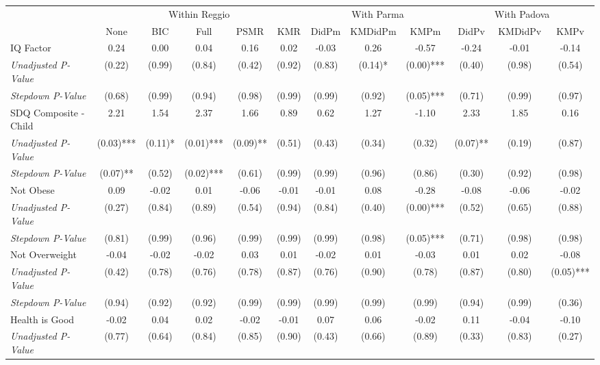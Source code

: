 \begin{tabular}{l c c c c c c c c c c c}
\toprule
& \multicolumn{5}{c}{Within Reggio} & \multicolumn{3}{c}{With Parma} & \multicolumn{3}{c}{With Padova} \\\cmidrule(lr){2-6} \cmidrule(lr){7-9} \cmidrule(lr){10-12}
 & None & BIC & Full & PSMR & KMR & DidPm & KMDidPm & KMPm & DidPv & KMDidPv & KMPv \\
\midrule
IQ Factor & 0.24 & 0.00 & 0.04 & 0.16 & 0.02 & -0.03 & 0.26 & -0.57 & -0.24 & -0.01 & -0.14 \\
\quad \textit{Unadjusted P-Value} & (0.22) & (0.99) & (0.84) & (0.42) & (0.92) & (0.83) & (0.14)* & (0.00)*** & (0.40) & (0.98) & (0.54) \\
\quad \textit{Stepdown P-Value} & (0.68) & (0.99) & (0.94) & (0.98) & (0.99) & (0.99) & (0.92) & (0.05)*** & (0.71) & (0.99) & (0.97) \\
SDQ Composite - Child & 2.21 & 1.54 & 2.37 & 1.66 & 0.89 & 0.62 & 1.27 & -1.10 & 2.33 & 1.85 & 0.16 \\
\quad \textit{Unadjusted P-Value} & (0.03)*** & (0.11)* & (0.01)*** & (0.09)** & (0.51) & (0.43) & (0.34) & (0.32) & (0.07)** & (0.19) & (0.87) \\
\quad \textit{Stepdown P-Value} & (0.07)** & (0.52) & (0.02)*** & (0.61) & (0.99) & (0.99) & (0.96) & (0.86) & (0.30) & (0.92) & (0.98) \\
Not Obese & 0.09 & -0.02 & 0.01 & -0.06 & -0.01 & -0.01 & 0.08 & -0.28 & -0.08 & -0.06 & -0.02 \\
\quad \textit{Unadjusted P-Value} & (0.27) & (0.84) & (0.89) & (0.54) & (0.94) & (0.84) & (0.40) & (0.00)*** & (0.52) & (0.65) & (0.88) \\
\quad \textit{Stepdown P-Value} & (0.81) & (0.99) & (0.96) & (0.99) & (0.99) & (0.99) & (0.98) & (0.05)*** & (0.71) & (0.98) & (0.98) \\
Not Overweight & -0.04 & -0.02 & -0.02 & 0.03 & 0.01 & -0.02 & 0.01 & -0.03 & 0.01 & 0.02 & -0.08 \\
\quad \textit{Unadjusted P-Value} & (0.42) & (0.78) & (0.76) & (0.78) & (0.87) & (0.76) & (0.90) & (0.78) & (0.87) & (0.80) & (0.05)*** \\
\quad \textit{Stepdown P-Value} & (0.94) & (0.92) & (0.92) & (0.99) & (0.99) & (0.99) & (0.99) & (0.99) & (0.94) & (0.99) & (0.36) \\
Health is Good & -0.02 & 0.04 & 0.02 & -0.02 & -0.01 & 0.07 & 0.06 & -0.02 & 0.11 & -0.04 & -0.10 \\
\quad \textit{Unadjusted P-Value} & (0.77) & (0.64) & (0.84) & (0.85) & (0.90) & (0.43) & (0.66) & (0.89) & (0.33) & (0.83) & (0.27) \\

\end{tabular}
